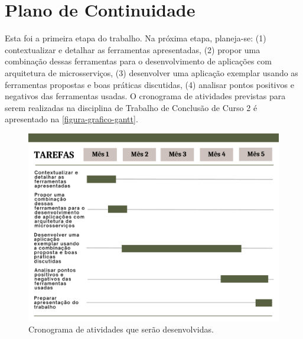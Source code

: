 \chapter{Plano de Continuidade}

Esta foi a primeira etapa do trabalho. Na próxima etapa, planeja-se: (1) contextualizar e detalhar as ferramentas apresentadas, (2) propor uma combinação dessas ferramentas para o desenvolvimento de aplicações com arquitetura de microsserviços, (3) desenvolver uma aplicação exemplar usando as ferramentas propostas e boas práticas discutidas, (4) analisar pontos positivos e negativos das ferramentas usadas. O cronograma de atividades previstas para serem realizadas na disciplina de Trabalho de Conclusão de Curso 2 é apresentado na \autoref{figura-grafico-gantt}.

\begin{figure}[htb]
	\caption{\label{figura-grafico-gantt}Cronograma de atividades que serão desenvolvidas.}
	\begin{center}
	    \includegraphics[scale=0.5]{Imagens/grafico-gantt.pdf}
	\end{center}
\end{figure}